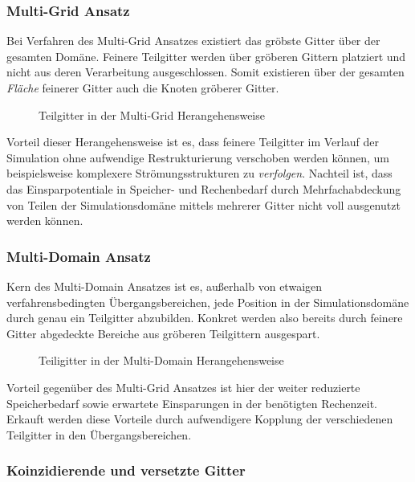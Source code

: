 \subsubsection{Multi-Grid Ansatz}

Bei Verfahren des Multi-Grid Ansatzes existiert das gröbste Gitter über der gesamten Domäne. Feinere Teilgitter werden über gröberen Gittern platziert und nicht aus deren Verarbeitung ausgeschlossen. Somit existieren über der gesamten \emph{Fläche} feinerer Gitter auch die Knoten gröberer Gitter.

\begin{figure}[h]
\centering

\caption{Teilgitter in der Multi-Grid Herangehensweise}
\end{figure}

Vorteil dieser Herangehensweise ist es, dass feinere Teilgitter im Verlauf der Simulation ohne aufwendige Restrukturierung verschoben werden können, um beispielsweise komplexere Strömungsstrukturen zu \emph{verfolgen}. Nachteil ist, dass das Einsparpotentiale in Speicher- und Rechenbedarf durch Mehrfachabdeckung von Teilen der Simulationsdomäne mittels mehrerer Gitter nicht voll ausgenutzt werden können.

\subsubsection{Multi-Domain Ansatz}

Kern des Multi-Domain Ansatzes ist es, außerhalb von etwaigen verfahrensbedingten Übergangsbereichen, jede Position in der Simulationsdomäne durch genau ein Teilgitter abzubilden. Konkret werden also bereits durch feinere Gitter abgedeckte Bereiche aus gröberen Teilgittern ausgespart.

\begin{figure}[h]
\centering

\caption{Teiligitter in der Multi-Domain Herangehensweise}
\end{figure}

\noindent
Vorteil gegenüber des Multi-Grid Ansatzes ist hier der weiter reduzierte Speicherbedarf sowie erwartete Einsparungen in der benötigten Rechenzeit. Erkauft werden diese Vorteile durch aufwendigere Kopplung \cite[Kap.~3.1]{lagrava12} der verschiedenen Teilgitter in den Übergangsbereichen.

\subsubsection{Koinzidierende und versetzte Gitter}

